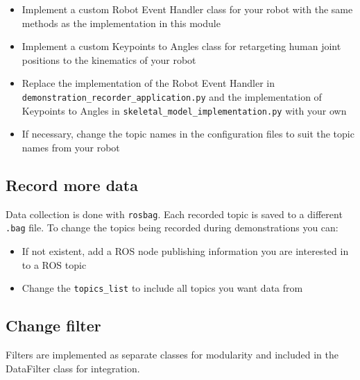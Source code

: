 \documentclass{CSSRforAfrica}
\begin{document}
\begin{itemize}[left=0em,  labelsep=1em, listparindent=1em] %
    \item Implement a custom Robot Event Handler class for your robot with the same methods as the implementation in this module
    \item Implement a custom Keypoints to Angles class for retargeting human joint positions to the kinematics of your robot
    \item Replace the implementation of the Robot Event Handler in \texttt{demonstration\_recorder\_application.py} and the implementation of Keypoints to Angles in \texttt{skeletal\_model\_implementation.py} with your own
    \item If necessary, change the topic names in the configuration files to suit the topic names from your robot
\end{itemize}

\subsection{Record more data}
Data collection is done with \texttt{rosbag}. Each recorded topic is saved to a different \texttt{.bag} file. To change the topics being recorded during demonstrations you can:

\begin{itemize}[left=0em,  labelsep=1em, listparindent=1em] %
    \item If not existent, add a ROS node publishing information you are interested in to a ROS topic
    \item Change the \texttt{topics\_list} to include all topics you want data from
\end{itemize}


\subsection{Change filter} \label{sec:anotherfilter}

Filters are implemented as separate classes for modularity and included in the DataFilter class for integration. 
\end{document}
